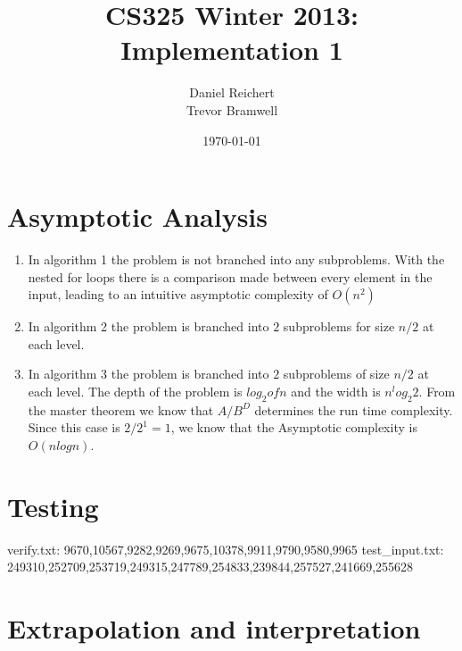 \documentclass[12pt]{article}
\title{CS325 Winter 2013: Implementation 1}
\author{
    Daniel Reichert \\
    Trevor Bramwell
}
\date{\today}
\begin{document}
\maketitle

\section*{Asymptotic Analysis}
    \begin{enumerate}

    \item In algorithm 1 the problem is not branched into any subproblems.
          With the nested for loops there is a comparison made between
          every element in the input, leading to an intuitive asymptotic
          complexity of $O(n^2)$

	\item In algorithm 2 the problem is branched into $2$ subproblems
          for size $n/2$ at each level.

    \item In algorithm 3 the problem is branched into $2$ subproblems of size
          $n/2$ at each level.  The depth of the problem is $log_2 of n$
          and the width is $n^log_2 2$.  From the master theorem we know
          that $A/B^D$ determines the run time complexity.  Since this
          case is $2/2^1 = 1$, we know that the Asymptotic complexity is
          $O(n log n)$.

    \end{enumerate}

\section*{Testing}
verify.txt:		9670,10567,9282,9269,9675,10378,9911,9790,9580,9965
test_input.txt:	249310,252709,253719,249315,247789,254833,239844,257527,241669,255628


\section*{Extrapolation and interpretation}
\end{document}
